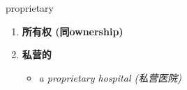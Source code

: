 
\begin{frame}
{\huge proprietary}
\begin{center}
\begin{enumerate}\Large
  \item \textbf{所有权 (同ownership)}
  \item \textbf{私营的}
  \begin{itemize}
    \item \em{\Large{a proprietary hospital (私营医院)}}
  \end{itemize}
\end{enumerate}
\end{center}
\end{frame}
